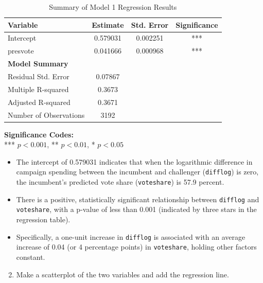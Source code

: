 \documentclass[12pt,letterpaper]{article}
\begin{document}
\begin{table}[h!]
	\centering
	\caption{Summary of Model 1 Regression Results}
	\vspace{0.25cm}
	\begin{tabular}{lccc}
		\toprule
		\textbf{Variable} & \textbf{Estimate} & \textbf{Std. Error} & \textbf{Significance} \\ 
		\midrule
		Intercept              & 0.579031 & 0.002251 & *** \\ 
		presvote               & 0.041666 & 0.000968 & *** \\ 
		\midrule
		\textbf{Model Summary} & & & \\
		Residual Std. Error    & 0.07867  & & \\ 
		Multiple R-squared     & 0.3673   & & \\ 
		Adjusted R-squared     & 0.3671   & & \\ 
		Number of Observations & 3192     & & \\ 
		\bottomrule
	\end{tabular}
\end{table}

\vspace{0.1cm}
\noindent\textbf{Significance Codes:} \\
*** $p < 0.001$, ** $p < 0.01$, * $p < 0.05$
	
\vspace{0.5cm} \begin{itemize}[left=0pt, label=\textbullet]
\item The intercept of 0.579031 indicates that when the logarithmic difference in campaign spending between the incumbent and challenger (\texttt{difflog}) is zero, the incumbent's predicted vote share (\texttt{voteshare}) is 57.9 percent.
\item There is a positive, statistically significant relationship between \texttt{difflog} and \texttt{voteshare}, with a p-value of less than 0.001 (indicated by three stars in the regression table).
\item Specifically, a one-unit increase in \texttt{difflog} is associated with an average increase of 0.04 (or 4 percentage points) in \texttt{voteshare}, holding other factors constant.
\end{itemize}

\newpage
	\begin{enumerate}[left=0pt]
	\setcounter{enumi}{1}
		\item Make a scatterplot of the two variables and add the regression line.
	\end{enumerate}
\end{document}

